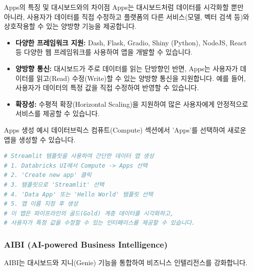 \documentclass[11pt,a4paper]{article}
\begin{document}
\begin{summarybox}{Apps의 특징 및 대시보드와의 차이점}
Apps는 대시보드처럼 데이터를 시각화할 뿐만 아니라, 사용자가 데이터를 직접 수정하고 플랫폼의 다른 서비스(모델, 벡터 검색 등)와 상호작용할 수 있는 양방향 기능을 제공합니다.
\end{summarybox}

\begin{itemize}
    \item \textbf{다양한 프레임워크 지원:} Dash, Flask, Gradio, Shiny (Python), NodeJS, React 등 다양한 웹 프레임워크를 사용하여 앱을 개발할 수 있습니다.
    \item \textbf{양방향 통신:} 대시보드가 주로 데이터를 읽는 단방향인 반면, Apps는 사용자가 데이터를 읽고(Read) 수정(Write)할 수 있는 양방향 통신을 지원합니다. 예를 들어, 사용자가 데이터의 특정 값을 직접 수정하여 반영할 수 있습니다.
    \item \textbf{확장성:} 수평적 확장(Horizontal Scaling)을 지원하여 많은 사용자에게 안정적으로 서비스를 제공할 수 있습니다.
\end{itemize}

\begin{examplebox}{Apps 생성 예시}
데이터브릭스 컴퓨트(Compute) 섹션에서 'Apps'를 선택하여 새로운 앱을 생성할 수 있습니다.
\begin{lstlisting}[language=Python, caption=Streamlit 기반 Hello World 앱 예시]
# Streamlit 템플릿을 사용하여 간단한 데이터 앱 생성
# 1. Databricks UI에서 Compute -> Apps 선택
# 2. 'Create new app' 클릭
# 3. 템플릿으로 'Streamlit' 선택
# 4. 'Data App' 또는 'Hello World' 템플릿 선택
# 5. 앱 이름 지정 후 생성
# 이 앱은 파이프라인의 골드(Gold) 계층 데이터를 시각화하고,
# 사용자가 특정 값을 수정할 수 있는 인터페이스를 제공할 수 있습니다.
\end{lstlisting}
\end{examplebox}

\subsubsection{AIBI (AI-powered Business Intelligence)}
AIBI는 대시보드와 지니(Genie) 기능을 통합하여 비즈니스 인텔리전스를 강화합니다.
\end{document}
